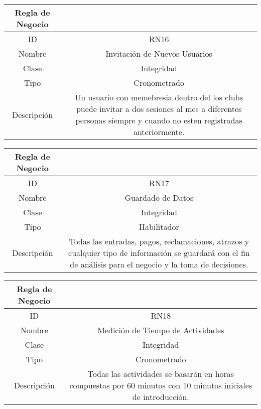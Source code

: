 \documentclass{article}
\begin{document}
\begin{center}
\begin{tabular}{ |c|c| } 
 \hline
 Regla de Negocio & \\
 \hline
 ID & RN16 \\ 
  \hline
  Nombre & Invitación de Nuevos Usuarios\\ 
  \hline
  Clase & Integridad\\ 
  \hline
  Tipo &  Cronometrado\\ 
  \hline
  Descripción & Un usuario con memebresia dentro del los clubs puede invitar a dos sesiones al mes a diferentes personas siempre y cuando no esten registradas anteriormente.\\ 
   \hline
 \hline
\end{tabular}
\end{center}

\begin{center}
\begin{tabular}{ |c|c| } 
 \hline
 Regla de Negocio & \\
 \hline
 ID & RN17 \\ 
  \hline
  Nombre & Guardado de Datos\\ 
  \hline
  Clase & Integridad\\ 
  \hline
  Tipo & Habilitador\\ 
  \hline
  Descripción & Todas las entradas, pagos, reclamaciones, atrazos y cualquier tipo de información se guardará con el fin de análisis para el negocio y la toma de decisiones.\\ 
   \hline
 \hline
\end{tabular}
\end{center}

\begin{center}
\begin{tabular}{ |c|c| } 
 \hline
 Regla de Negocio & \\
 \hline
 ID & RN18 \\ 
  \hline
  Nombre & Medición de Tiempo de Actividades\\ 
  \hline
  Clase & Integridad\\ 
  \hline
  Tipo & Cronometrado\\ 
  \hline
  Descripción & Todas las actividades se basarán en horas compuestas por 60 minutos con 10 minutos iniciales de introducción.\\ 
   \hline
 \hline
\end{tabular}
\end{center}
\end{document}
